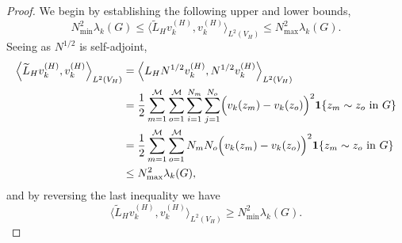 \documentclass{article}
\newcommand{\1}{\mathbf{1}}
\newcommand{\dotp}[2]{\langle #1, #2 \rangle}
\newcommand{\wt}[1]{\widetilde{#1}}
\newcommand{\mc}[1]{\mathcal{#1}}
\theoremstyle{alden}
\theoremstyle{aldenthm}
\theoremstyle{definition}
\theoremstyle{remark}
\begin{document}
\begin{proof}
We begin by establishing the following upper and lower bounds,
\begin{equation}
\label{eqn:alden_product_graph_pf1}
N_{\min}^2 \lambda_k(G) \leq \dotp{\wt{L}_H v_k^{(H)}}{v_k^{(H)}}_{L^2(V_H)} \leq N_{\max}^2 \lambda_k(G). 
\end{equation}
Seeing as $N^{1/2}$ is self-adjoint, 
\begin{align*}
\Bigl \langle\wt{L}_H v_k^{(H)}, v_k^{(H)} \Bigr \rangle_{L^2(V_H)} & = \Bigl \langle L_H N^{1/2} v_k^{(H)},N^{1/2}v_k^{(H)} \Bigr \rangle_{L^2(V_H)} \\ 
& = \frac{1}{2}\sum_{m = 1}^{\mc{M}} \sum_{o = 1}^{\mc{M}} \sum_{i = 1}^{N_m} \sum_{j = 1}^{N_o} \Bigl(v_k(z_m) - v_k(z_o)\Bigr)^2 \1\{z_m \sim z_o~\textrm{in $G$}\} \\
& = \frac{1}{2}\sum_{m = 1}^{\mc{M}} \sum_{o = 1}^{\mc{M}} N_m N_o \Bigl(v_k(z_m) - v_k(z_o)\Bigr)^2 \1\{z_m \sim z_o~\textrm{in $G$}\} \\
& \leq N_{\max}^2 \lambda_k(G),
\end{align*}
and by reversing the last inequality we have
\begin{equation*}
\dotp{\wt{L}_H v_k^{(H)}}{v_k^{(H)}}_{L^2(V_H)} \geq N_{\min}^2 \lambda_k(G).
\end{equation*}


\end{proof}
\end{document}

